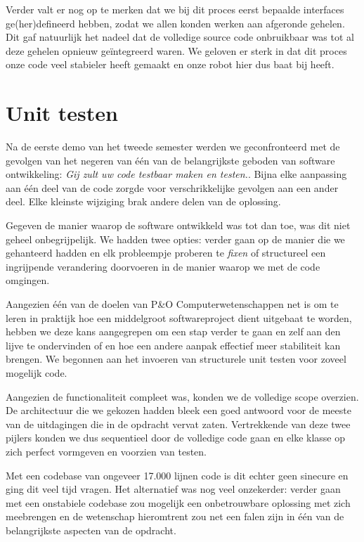 \documentclass[12pt,a4paper]{report}
\begin{document}
Verder valt er nog op te merken dat we bij dit proces eerst bepaalde interfaces ge(her)defineerd hebben, zodat we allen konden werken aan afgeronde gehelen. Dit gaf natuurlijk het nadeel dat de volledige source code onbruikbaar was tot al deze gehelen opnieuw ge\"integreerd waren. We geloven er sterk in dat dit proces onze code veel stabieler heeft gemaakt en onze robot hier dus baat bij heeft.

\section{Unit testen}
\label{unittesten}

Na de eerste demo van het tweede semester werden we geconfronteerd met de gevolgen van het negeren van \'e\'en van de belangrijkste geboden van software ontwikkeling: \emph{Gij zult uw code testbaar maken en testen.}. Bijna elke aanpassing aan \'e\'en deel van de code zorgde voor verschrikkelijke gevolgen aan een ander deel. Elke kleinste wijziging brak andere delen van de oplossing.

Gegeven de manier waarop de software ontwikkeld was tot dan toe, was dit niet geheel onbegrijpelijk. We hadden twee opties: verder gaan op de manier die we gehanteerd hadden en elk probleempje proberen te \emph{fixen} of structureel een ingrijpende verandering doorvoeren in de manier waarop we met de code omgingen.

Aangezien \'e\'en van de doelen van P\&O Computerwetenschappen net is om te leren in praktijk hoe een middelgroot softwareproject dient uitgebaat te worden, hebben we deze kans aangegrepen om een stap verder te gaan en zelf aan den lijve te ondervinden of en hoe een andere aanpak effectief meer stabiliteit kan brengen. We begonnen aan het invoeren van structurele unit testen voor zoveel mogelijk code.

Aangezien de functionaliteit compleet was, konden we de volledige scope overzien. De architectuur die we gekozen hadden bleek een goed antwoord voor de meeste van de uitdagingen die in de opdracht vervat zaten. Vertrekkende van deze twee pijlers konden we dus sequentieel door de volledige code gaan en elke klasse op zich perfect vormgeven en voorzien van testen.

Met een codebase van ongeveer 17.000 lijnen code is dit echter geen sinecure en ging dit veel tijd vragen. Het alternatief was nog veel onzekerder: verder gaan met een onstabiele codebase zou mogelijk een onbetrouwbare oplossing met zich meebrengen en de wetenschap hieromtrent zou net een falen zijn in \'e\'en van de belangrijkste aspecten van de opdracht.
\end{document}
